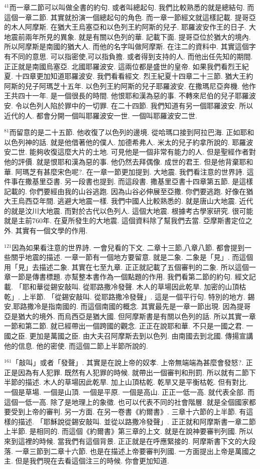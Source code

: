 \documentclass{book}
\begin{document}
$^{41}$而一章二節可以叫做全書的約句.
或者叫總起句.
我們比較熟悉的就是總結句.
而這個一章二節.
其實就扮演一個總起句的角色.
而一章一節經文就這樣記載.
提哥亞的木人阿摩斯.
在猶大王烏塞亞和以色列王約阿斯的兒子.
耶羅波安作王的日子.
大地震前兩年所見的異象.
就是有關以色列的華.
記載下面.
提哥亞位於猶大的境內.
所以阿摩斯是南國的猶大人.
而他的名字叫做阿摩斯.
在注二的資料中.
其實這個字有不同的意思.
可以指密使,可以指負擔.
或者得到支持的人.
而他出任先知的期間.
正正就是南國烏塞亞.
北國耶羅波安.
這兩位都是盛世的皇帝.
如果我們看烈王紀夏.
十四章更加知道耶羅波安.
我們看看經文.
烈王紀夏十四章二十三節.
猶大王約阿斯的兒子阿瑪芝十五年.
以色列王約阿斯的兒子耶羅波安.
在撒瑪尼亞奔機.
他作王共四十一年.
是一個很長的時間.
他恨耶和漢為惡的事.
不轉來尼伯的兒子耶羅波安.
令以色列人陷於罪中的一切罪.
在二十四節.
我們知道有另一個耶羅波安.
所以近代的人.
都會分開一個叫耶羅波安一世.
一個叫耶羅波安二世.

$^{81}$而留意的是二十五節.
他收復了以色列的邊境.
從哈瑪口接到阿拉巴海.
正如耶和以色列神的話.
就是他借著他的僕人.
加德希弗人.
米太的兒子約拿所說的.
耶羅波安二世.
能夠收復這麼大片的土地.
可見他是一個非常有能力的人.
但是聖經作者對他的評價.
就是恨耶和漢為惡的事.
他仍然去拜偶像.
成世的君王.
但是他背棄耶和華.
阿瑪芝有甚麼宋色呢?.
在一章一節更加提到.
大地震.
我們看注意的世界詩.
這件事在撒基里亞書.
另一段書也提到.
而這段書.
撒基里亞書十四章第五節.
是這樣記載的.
你們要經由我的山谷逃跑.
因為山谷必伸展至亞撒.
你們要逃跑.
好像在猶大王烏西亞年間.
逃避大地震一樣.
我們中國人比較熟悉的.
就是唐山大地震.
近代的就是汶川大地震.
而對於古代以色列人.
這個大地震.
根據考古學家研究.
很可能就是主前760年.
在夏所發生的大地震.
這個資料除了幫我們去當.
亞摩斯書定位之外.
其實有一個文學的作用.

$^{121}$因為如果看注意的世界詩.
一會兒看的下文.
二章十三節,八章八節.
都會提到一些關乎地震的描述.
一章一節有一個地方要留意.
就是二象.
二象是「見」.
而這個用「見」去描述二象.
其實在七至九章.
正正就記載了五個審判的二象.
所以這個一章一節是傳書標題.
亦幫整本書作為一個點題的作用.
我們看第二節的約句.
經文記載.
「耶和華從錫安敲叫.
從耶路撒冷發聲.
木人的草場因此乾旱.
加密的山頂枯乾」.
上半節.
「從錫安敲叫.
從耶路撒冷發聲」.
這是一個平行句.
特別的地方.
錫安,耶路撒冷是指南國的.
而這個南國的概念.
其實最先是一章一節出現.
因為提哥亞是猶大的境外.
而烏西亞是猶大國.
但阿摩斯書是有關以色列的話.
所以其實一章一節和第二節.
就已經帶出一個跨國的觀念.
正正在說耶和華.
不只是一國之君.
一國之臣.
更加是萬國之臣.
由大夫召阿摩斯去到以色列.
由南國去到北國.
傳揚宣講他的信息.
他的密使.
而這個二節上半節所說的.

$^{161}$「敲叫」或者「發聲」.
其實是在說上帝的奴孝.
上帝無端端為甚麼會發怒?.
正正是因為有人犯罪.
既然有人犯罪的時候.
就帶出一個審判和刑罰.
所以就有二節下半節的描述.
木人的草場因此乾旱.
加上山頂枯乾.
乾旱又是平衡枯乾.
但有對比.
一個是草場.
一個是山頂.
一個是平原.
一個是高山.
正正一低一高.
就代表全部.
而這個一低一高.
除了是地理上的象徵.
也可以代表不同的社會階層.
就是全個國家都要受到上帝的審判.
另一方面.
在另一卷書《約爾書》.
三章十六節的上半節.
有這樣的描述.
「耶穌說從錫安敲叫.
並從以路撒冷發聲」.
正正就和阿摩斯書一章二節上半節.
是相同的.
而這個《約爾書》第三章的上文.
就是在說神要審判列國.
所以來到這裡的時候.
當我們有這個背景.
正正就是在呼應緊接的.
阿摩斯書下文的大段落.
一章三節到二章十六節.
也是在描述上帝要審判列國.
一方面提出上帝是萬國之主.
但是我們現在去看這個注三的時候.
你會更加知道.
\end{document}
